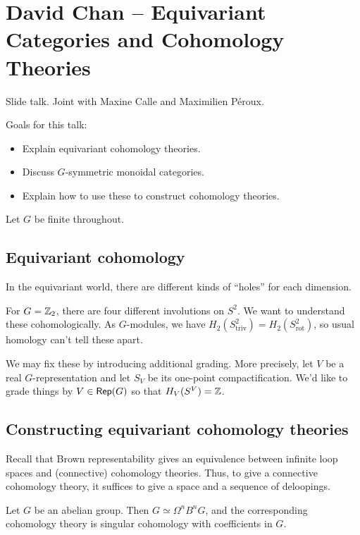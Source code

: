 \documentclass{amsart}
\begin{document}
\section{David Chan -- Equivariant Categories and Cohomology Theories}

Slide talk.
Joint with Maxine Calle and Maximilien P\'eroux.

Goals for this talk:
\begin{itemize}
  \item Explain equivariant cohomology theories.
  \item Discuss $G$-symmetric monoidal categories.
  \item Explain how to use these to construct cohomology theories.
\end{itemize}

Let $G$ be finite throughout.

\subsection{Equivariant cohomology}

In the equivariant world, there are different kinds of ``holes'' for each dimension.

\begin{ex}
  For $G = \mathbb{Z}_2$, there are four different involutions on $S^2$.
  We want to understand these cohomologically.
  As $G$-modules, we have $H_2(S^2_\mathrm{triv}) = H_2(S^2_\mathrm{rot})$, so usual homology can't tell these apart.
\end{ex}

We may fix these by introducing additional grading.
More precisely, let $V$ be a real $G$-representation and let $S_V$ be its one-point compactification.
We'd like to grade things by $V \in \operatorname{\mathsf{Rep}}(G)$ so that $H_V(S^V) = \mathbb{Z}$.

\subsection{Constructing equivariant cohomology theories}

Recall that Brown representability gives an equivalence between infinite loop spaces and (connective) cohomology theories.
Thus, to give a connective cohomology theory, it suffices to give a space and a sequence of deloopings.

\begin{ex}
  Let $G$ be an abelian group.
  Then $G \simeq \Omega^n B^n G$, and the corresponding cohomology theory is singular cohomology with coefficients in $G$.
\end{ex}
\end{document}
